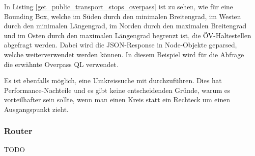 In Listing \ref{get_public_transport_stops_overpass} ist zu sehen, wie für eine Bounding Box, welche im Süden durch den minimalen Breitengrad, im Westen durch den minimalen Längengrad, im Norden durch den maximalen Breitengrad und im Osten durch den maximalen Längengrad begrenzt ist, die ÖV-Haltestellen abgefragt werden. Dabei wird die JSON-Response in Node-Objekte geparsed, welche weiterverwendet werden können. In diesem Beispiel wird für die Abfrage die erwähnte Overpass QL verwendet.

Es ist ebenfalls möglich, eine Umkreissuche mit   durchzuführen. Dies hat Performance-Nachteile und es gibt keine entscheidenden Gründe, warum es vorteilhafter sein sollte, wenn man einen Kreis statt ein Rechteck um einen Ausgangspunkt zieht.

\subsubsection{Router}
\label{architektur:Router}

TODO
